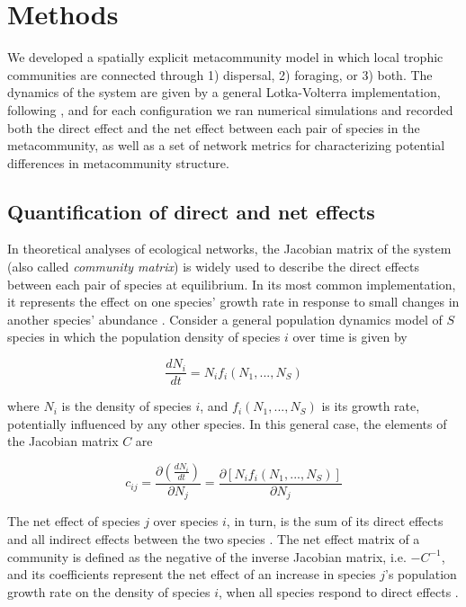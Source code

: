 \section{Methods}

We developed a spatially explicit metacommunity model in which local trophic communities are connected through 1) dispersal, 2) foraging, or 3) both. The dynamics of the system are given by a general Lotka-Volterra implementation, following \cite{Gravel2016a}, and for each configuration we ran numerical simulations and recorded both the direct effect and the net effect between each pair of species in the metacommunity, as well as a set of network metrics for characterizing potential differences in metacommunity structure.

\subsection*{Quantification of direct and net effects}
In theoretical analyses of ecological networks, the Jacobian matrix of the system (also called \textit{community matrix}) is widely used to describe the direct effects between each pair of species at equilibrium. In its most common implementation, it represents the effect on one species' growth rate in response to small changes in another species' abundance \citep{Berlow2004, Novak2016}. Consider a general population dynamics model of $S$ species in which the population density of species $i$ over time is given by

\begin{equation}
\frac{dN_i}{dt} = N_i f_i(N_1,...,N_S)
\end{equation}

where $N_i$ is the density of species $i$, and $f_i(N_1,...,N_S)$ is its growth rate, potentially influenced by any other species. In this general case, the elements of the Jacobian matrix $C$ are

\begin{equation}
c_{ij} = \frac{\partial (\frac{dN_i}{dt})}{\partial N_j} = \frac{\partial [N_i f_i(N_1,...,N_S)]}{\partial N_j}
\end{equation}

The net effect of species $j$ over species $i$, in turn, is the sum of its direct effects and all indirect effects between the two species \citep{Bender1984,Montoya2009a,Novak2016}. The net effect matrix of a community is defined as the negative of the inverse Jacobian matrix, i.e. $-C^{-1}$, and its coefficients represent the net effect of an increase in species $j$'s population growth rate on the density of species $i$, when all species respond to direct effects \citep{Novak2016}.

